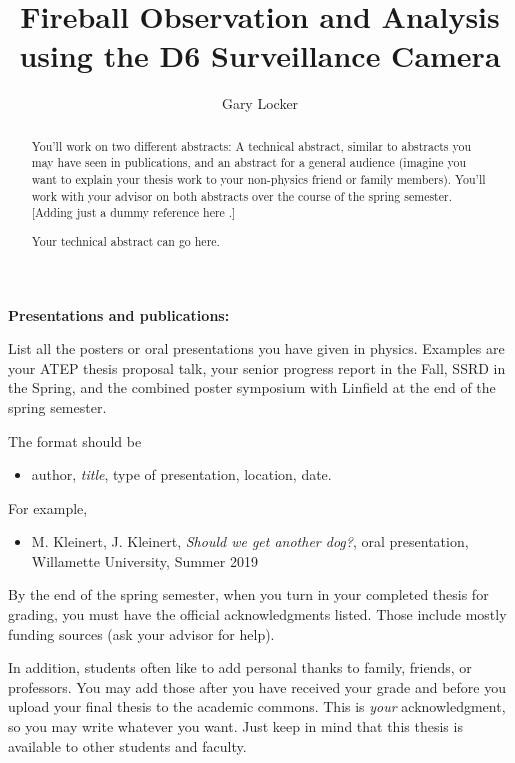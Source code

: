 \documentclass[12pt]{report}
\begin{document}
\title{Fireball Observation and Analysis using the D6 Surveillance Camera}
\author{Gary Locker}

\maketitle


\newpage

\begin{center}
\textbf{Presentations and publications:}
\end{center}

List all the posters or oral presentations you have given in physics. Examples are your ATEP thesis proposal talk, your senior progress report in the Fall, SSRD in the Spring, and the combined poster symposium with Linfield at the end of the spring semester.

The format should be 

\begin{itemize}
    \item author, \textit{title}, type of presentation, location, date. 
\end{itemize}

For example,
\begin{itemize}
\item M. Kleinert, J. Kleinert, \textit{Should we get another dog?}, oral presentation, Willamette University, Summer 2019
\end{itemize}

\newpage

\begin{acknowledgments}
By the end of the spring semester, when you turn in your completed thesis for grading, you must have the official acknowledgments listed. Those include mostly funding sources (ask your advisor for help). 

In addition, students often like to add personal thanks to family, friends, or professors. You may add those after you have received your grade and before you upload your final thesis to the academic commons. This is \textit{your} acknowledgment, so you may write whatever you want. Just keep in mind that this thesis is available to other students and faculty. 
\end{acknowledgments}

\newpage

\begin{abstract}
    \begin{general}
        You'll work on two different abstracts: A technical abstract, similar to abstracts you may have seen in publications, and an abstract for a general audience (imagine you want to explain your thesis work to your non-physics friend or family members). You'll work with your advisor on both abstracts over the course of the spring semester. [Adding just a dummy reference here \cite{PBrown2002}.]
    \end{general}
    
    \begin{technical}
        Your technical abstract can go here.
    \end{technical}
\end{abstract}
\end{document}
